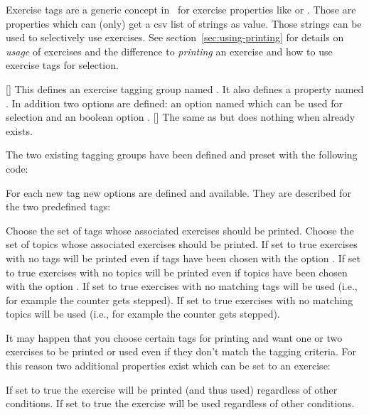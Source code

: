 \documentclass{xsim-manual}
\begin{document}
Exercise tags are a generic concept in \xsim\ for exercise properties like
 or .  Those are properties which can (only)
get a csv list of strings as value.  Those strings can be used to selectively
use exercises.  See section~\vref{sec:using-printing} for details on
\emph{usage} of exercises and the difference to \emph{printing} an exercise
and how to use exercise tags for selection.
\begin{commands}
  []
    This defines an exercise tagging group named .  It also defines a
    property named .  In addition two options are defined: an option
    named  which can be used for selection and an boolean
    option .
  []
    The same as  but does
    nothing when  already exists.
\end{commands}
The two existing tagging groups have been defined and preset with the
following code:
\begin{sourcecode}
\end{sourcecode}
For each new tag new options are defined and available.  They are described
for the two predefined tags:
\begin{options}
    Choose the set of tags whose associated exercises should be printed.
    Choose the set of topics whose associated exercises should be printed.
    If set to true exercises with no tags will be printed even if tags have
    been chosen with the option .
    If set to true exercises with no topics will be printed even if topics
    have been chosen with the option .
    If set to true exercises with no matching tags will be
    used (i.e., for example the counter gets stepped).
    If set to true exercises with no matching topics will
    be used (i.e., for example the counter gets stepped).
\end{options}

It may happen that you choose certain tags for printing and want one or two
exercises to be printed or used even if they don't match the tagging
criteria.  For this reason two additional properties exist which can be set to
an exercise:\label{property:print!}
\begin{properties}
    If set to true the exercise will be printed (and thus used) regardless of
    other conditions.
    If set to true the exercise will be used regardless of other conditions.
\end{properties}
\end{document}

